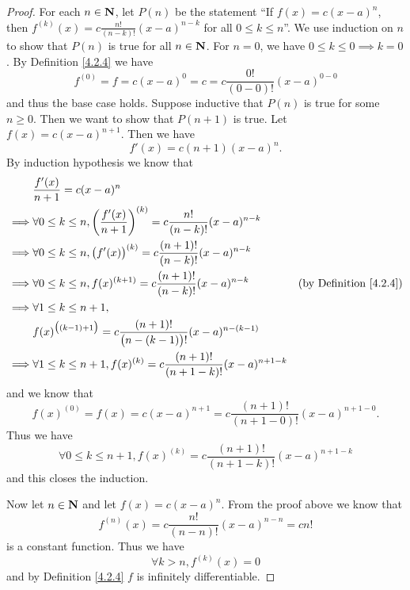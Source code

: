 \begin{proof}
    For each \(n \in \mathbf{N}\), let \(P(n)\) be the statement ``If \(f(x) = c (x - a)^n\), then \(f^{(k)}(x) = c \frac{n!}{(n - k)!} (x - a)^{n - k}\) for all \(0 \leq k \leq n\)''.
    We use induction on \(n\) to show that \(P(n)\) is true for all \(n \in \mathbf{N}\).
    For \(n = 0\), we have \(0 \leq k \leq 0 \implies k = 0\).
    By Definition \ref{4.2.4} we have
    \[
        f^{(0)} = f = c (x - a)^0 = c = c \frac{0!}{(0 - 0)!} (x - a)^{0 - 0}
    \]
    and thus the base case holds.
    Suppose inductive that \(P(n)\) is true for some \(n \geq 0\).
    Then we want to show that \(P(n + 1)\) is true.
    Let \(f(x) = c (x - a)^{n + 1}\).
    Then we have
    \[
        f'(x) = c (n + 1) (x - a)^n.
    \]
    By induction hypothesis we know that
    \begin{align*}
                 & \frac{f'(x)}{n + 1} = c (x - a)^n                                                                                                           \\
        \implies & \forall 0 \leq k \leq n, \bigg(\frac{f'(x)}{n + 1}\bigg)^{(k)} = c \frac{n!}{(n - k)!} (x - a)^{n - k}                                      \\
        \implies & \forall 0 \leq k \leq n, \big(f'(x)\big)^{(k)} = c \frac{(n + 1)!}{(n - k)!} (x - a)^{n - k}                                                \\
        \implies & \forall 0 \leq k \leq n, f(x)^{(k + 1)} = c \frac{(n + 1)!}{(n - k)!} (x - a)^{n - k}                  & \text{(by Definition \ref{4.2.4})} \\
        \implies & \forall 1 \leq k \leq n + 1,                                                                                                                \\
                 & f(x)^{\big((k - 1) + 1\big)} = c \frac{(n + 1)!}{\big(n - (k - 1)\big)!} (x - a)^{n - (k - 1)}                                              \\
        \implies & \forall 1 \leq k \leq n + 1, f(x)^{(k)} = c \frac{(n + 1)!}{(n + 1 - k)!} (x - a)^{n + 1 - k}
    \end{align*}
    and we know that
    \[
        f(x)^{(0)} = f(x) = c (x - a)^{n + 1} = c \frac{(n + 1)!}{(n + 1 - 0)!} (x - a)^{n + 1 - 0}.
    \]
    Thus we have
    \[
        \forall 0 \leq k \leq n + 1, f(x)^{(k)} = c \frac{(n + 1)!}{(n + 1 - k)!} (x - a)^{n + 1 - k}
    \]
    and this closes the induction.

    Now let \(n \in \mathbf{N}\) and let \(f(x) = c (x - a)^n\).
    From the proof above we know that
    \[
        f^{(n)}(x) = c \frac{n!}{(n - n)!} (x - a)^{n - n} = c n!
    \]
    is a constant function.
    Thus we have
    \[
        \forall k > n, f^{(k)}(x) = 0
    \]
    and by Definition \ref{4.2.4} \(f\) is infinitely differentiable.
\end{proof}

